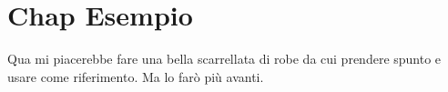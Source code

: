 
\section{Chap Esempio}
Qua mi piacerebbe fare una bella scarrellata di robe da cui prendere spunto e usare come riferimento.
Ma lo farò più avanti.
